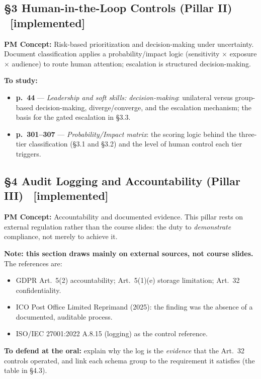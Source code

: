\documentclass[12pt,a4paper]{article}
\newcommand{\statusdone}{\textcolor{donegreen}{\small\textbf{[implemented]}}}
\newcommand{\slide}[3]{\item \textbf{p.~#1} --- \textit{#2}: #3}
\newcommand{\concetto}[1]{\textbf{PM Concept:} #1\par\vspace{2pt}}
\begin{document}
\subsection{\S3 Human-in-the-Loop Controls (Pillar II) \ \statusdone}
\concetto{Risk-based prioritization and decision-making under uncertainty. Document classification applies a probability/impact logic (sensitivity $\times$ exposure $\times$ audience) to route human attention; escalation is structured decision-making.}
\textbf{To study:}
\begin{itemize}
  \slide{44}{Leadership and soft skills: decision-making}{unilateral versus group-based decision-making, diverge/converge, and the escalation mechanism; the basis for the gated escalation in \S3.3.}
  \slide{301--307}{Probability/Impact matrix}{the scoring logic behind the three-tier classification (\S3.1 and \S3.2) and the level of human control each tier triggers.}
\end{itemize}

\subsection{\S4 Audit Logging and Accountability (Pillar III) \ \statusdone}
\concetto{Accountability and documented evidence. This pillar rests on external regulation rather than the course slides: the duty to \emph{demonstrate} compliance, not merely to achieve it.}
\textbf{Note: this section draws mainly on external sources, not course slides.} The references are:
\begin{itemize}
  \item GDPR Art.~5(2) accountability; Art.~5(1)(e) storage limitation; Art.~32 confidentiality.
  \item ICO Post Office Limited Reprimand (2025): the finding was the absence of a documented, auditable process.
  \item ISO/IEC 27001:2022 A.8.15 (logging) as the control reference.
\end{itemize}
\textbf{To defend at the oral:} explain why the log is the \emph{evidence} that the Art.~32 controls operated, and link each schema group to the requirement it satisfies (the table in \S4.3).

\end{document}
